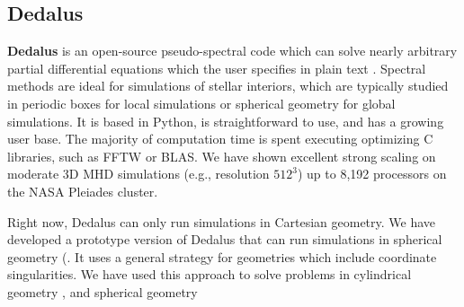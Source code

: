 {\color{purple}    
\subsection{Dedalus}}

\textbf{Dedalus} is an open-source pseudo-spectral code which can solve nearly arbitrary partial differential equations which the user specifies in plain text \citep[][source code at: dedalus-project.org]{Burns2016}. Spectral methods are ideal for simulations of stellar interiors, which are typically studied in periodic boxes for local simulations or spherical geometry for global simulations. It is based in Python, is straightforward to use, and has a growing user base. The majority of computation time is spent executing optimizing C libraries, such as FFTW or BLAS. We have shown excellent strong scaling on moderate 3D MHD simulations (e.g., resolution $512^3$) up to 8,192 processors on the NASA Pleiades cluster.

Right now, Dedalus can only run simulations in Cartesian geometry. We have developed a prototype version of Dedalus that can run simulations in spherical geometry (. It uses a general strategy for geometries which include coordinate singularities. We have used this approach to solve problems in cylindrical geometry \cite{Vasil_2016}, and spherical geometry \cite{p}


